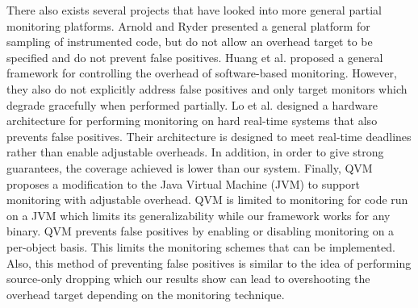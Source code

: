There also exists several projects that have looked into more general partial
monitoring platforms. Arnold and Ryder \cite{arnold-pldi01} presented a general
platform for sampling of instrumented code, but do not allow an overhead target
to be specified and do not prevent false positives. Huang et al.
\cite{huang-sttt12} proposed a general framework for controlling the overhead
of software-based monitoring. However, they also do not explicitly address
false positives and only target monitors which degrade gracefully when
performed partially. Lo et al. \cite{lo-rtas14} designed a hardware
architecture for performing monitoring on hard real-time systems that also
prevents false positives. Their architecture is designed to meet real-time
deadlines rather than enable adjustable overheads. In addition, in order to give strong
guarantees, the coverage achieved is lower than our system. Finally, QVM
\cite{qvm-oopsla08} proposes a modification to the Java Virtual Machine (JVM) to
support monitoring with adjustable overhead. 
QVM is limited to monitoring for code run on a JVM which limits its
generalizability while our framework works for any binary. QVM prevents false
positives by enabling or disabling monitoring on a per-object basis. This
limits the monitoring schemes that can be implemented. Also, this method of
preventing false positives is similar to the idea of performing source-only
dropping which our results show can lead to overshooting the overhead target
depending on the monitoring technique. 



